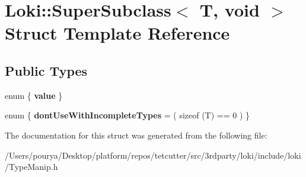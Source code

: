 \hypertarget{structLoki_1_1SuperSubclass_3_01T_00_01void_01_4}{}\section{Loki\+:\+:Super\+Subclass$<$ T, void $>$ Struct Template Reference}
\label{structLoki_1_1SuperSubclass_3_01T_00_01void_01_4}
\subsection*{Public Types}
\begin{DoxyCompactItemize}
\item 
\hypertarget{structLoki_1_1SuperSubclass_3_01T_00_01void_01_4_aa2092d92205c238cf4254293cff7f447}{}enum \{ {\bfseries value}
 \}\label{structLoki_1_1SuperSubclass_3_01T_00_01void_01_4_aa2092d92205c238cf4254293cff7f447}

\item 
\hypertarget{structLoki_1_1SuperSubclass_3_01T_00_01void_01_4_ae75d2c13054b798e0c088a691480b6fb}{}enum \{ {\bfseries dont\+Use\+With\+Incomplete\+Types} = ( sizeof (T) == 0 )
 \}\label{structLoki_1_1SuperSubclass_3_01T_00_01void_01_4_ae75d2c13054b798e0c088a691480b6fb}

\end{DoxyCompactItemize}


The documentation for this struct was generated from the following file\+:\begin{DoxyCompactItemize}
\item 
/\+Users/pourya/\+Desktop/platform/repos/tetcutter/src/3rdparty/loki/include/loki/Type\+Manip.\+h\end{DoxyCompactItemize}
